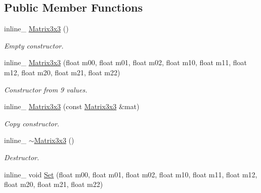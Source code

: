 \subsection*{Public Member Functions}
\begin{DoxyCompactItemize}
\item 
inline\+\_\+ \hyperlink{classMatrix3x3_ad29ce73053fb451f5de0debb2959e72e}{Matrix3x3} ()\hypertarget{classMatrix3x3_ad29ce73053fb451f5de0debb2959e72e}{}\label{classMatrix3x3_ad29ce73053fb451f5de0debb2959e72e}

\begin{DoxyCompactList}\small\item\em Empty constructor. \end{DoxyCompactList}\item 
inline\+\_\+ \hyperlink{classMatrix3x3_a005fba917326df36dc28fadd7f54e4d8}{Matrix3x3} (float m00, float m01, float m02, float m10, float m11, float m12, float m20, float m21, float m22)\hypertarget{classMatrix3x3_a005fba917326df36dc28fadd7f54e4d8}{}\label{classMatrix3x3_a005fba917326df36dc28fadd7f54e4d8}

\begin{DoxyCompactList}\small\item\em Constructor from 9 values. \end{DoxyCompactList}\item 
inline\+\_\+ \hyperlink{classMatrix3x3_ade9bc27bcc432ce3543cda754ed0cf4a}{Matrix3x3} (const \hyperlink{classMatrix3x3}{Matrix3x3} \&mat)\hypertarget{classMatrix3x3_ade9bc27bcc432ce3543cda754ed0cf4a}{}\label{classMatrix3x3_ade9bc27bcc432ce3543cda754ed0cf4a}

\begin{DoxyCompactList}\small\item\em Copy constructor. \end{DoxyCompactList}\item 
inline\+\_\+ \hyperlink{classMatrix3x3_a596ea10f85a00caa0940275c9bd830a5}{$\sim$\+Matrix3x3} ()\hypertarget{classMatrix3x3_a596ea10f85a00caa0940275c9bd830a5}{}\label{classMatrix3x3_a596ea10f85a00caa0940275c9bd830a5}

\begin{DoxyCompactList}\small\item\em Destructor. \end{DoxyCompactList}\item 
inline\+\_\+ void \hyperlink{classMatrix3x3_a58ebc2c0d6b582fb7eb6bb3b78c97ad6}{Set} (float m00, float m01, float m02, float m10, float m11, float m12, float m20, float m21, float m22)\hypertarget{classMatrix3x3_a58ebc2c0d6b582fb7eb6bb3b78c97ad6}{}\label{classMatrix3x3_a58ebc2c0d6b582fb7eb6bb3b78c97ad6}


\end{DoxyCompactItemize}
